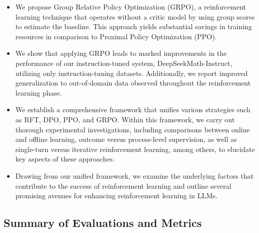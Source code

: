\begin{itemize}[topsep=0pt]
    \item We propose Group Relative Policy Optimization (GRPO), a reinforcement learning technique that operates without a critic model by using group scores to estimate the baseline. This approach yields substantial savings in training resources in comparison to Proximal Policy Optimization (PPO).
    \item We show that applying GRPO leads to marked improvements in the performance of our instruction-tuned system, DeepSeekMath-Instruct, utilizing only instruction-tuning datasets. Additionally, we report improved generalization to out-of-domain data observed throughout the reinforcement learning phase.
    \item We establish a comprehensive framework that unifies various strategies such as RFT, DPO, PPO, and GRPO. Within this framework, we carry out thorough experimental investigations, including comparisons between online and offline learning, outcome versus process-level supervision, as well as single-turn versus iterative reinforcement learning, among others, to elucidate key aspects of these approaches.
    \item Drawing from our unified framework, we examine the underlying factors that contribute to the success of reinforcement learning and outline several promising avenues for enhancing reinforcement learning in LLMs.
\end{itemize}

\subsection{Summary of Evaluations and Metrics}

